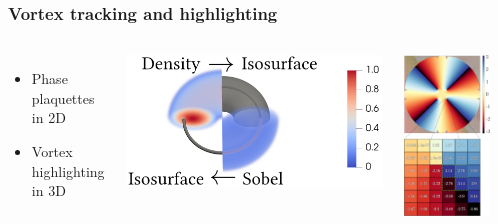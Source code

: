 \documentclass{beamer}
\begin{document}
\begin{frame}
\frametitle{Vortex tracking and highlighting}
\begin{columns}
\begin{itemize}
\item Phase plaquettes in 2D
\item Vortex highlighting in 3D
\end{itemize}
\center \includegraphics[width=1.2\textwidth]{all.png}

\center \includegraphics[width = 0.8\textwidth]{../data/gpu/vortex_tracking/phi_grid.png}

\end{columns}
\end{frame}
\end{document}
